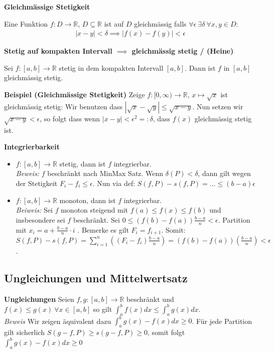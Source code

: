 \documentclass[25pt]{sciposter}
\newcommand{\R}{\mathbb{R}}
\newenvironment{method}[1]{\begin{mdframed}[backgroundcolor=blue!10,innertopmargin=15pt, innerbottommargin=15pt, nobreak=true]
		\textbf{#1 }
	}
	{ 
	\end{mdframed}
}
\begin{document}
\begin{multicols}{3}
\begin{method}{Gleichmässige Stetigkeit}
	Eine Funktion $f:D \to \R$, $D \subseteq \R$ ist auf $D$ gleichmässig falls $\forall \epsilon \ \exists \delta \ \forall x,y \in D$:
	\begin{align*}
			|x-y| < \delta \implies |f(x) - f(y)| < \epsilon
	\end{align*}
\end{method}

\begin{method}{Stetig auf kompakten Intervall $\implies$ gleichmässig stetig / (Heine)}
Sei $f : [a,b] \to \R$ stetig in dem kompakten Intervall $[a,b]$. Dann ist $f$ in $[a,b]$ gleichmässig stetig.
\end{method}

\textbf{Beispiel (Gleichmässige Stetigkeit)} Zeige $f:[0,\infty) \to \R$, $x \mapsto \sqrt{x}$ ist gleichmässig stetig: Wir benutzen dass $|\sqrt{x} - \sqrt{y}| \leq \sqrt{x - y}$. Nun setzen wir $ \sqrt{x - y} < \epsilon$, so folgt dass wenn $|x-y|< \epsilon^2 =: \delta$, dass $f(x)$ gleichmässig stetig ist.

\begin{method}{Integrierbarkeit}
	\begin{itemize}
		\item $f:[a,b]\to \R$ stetig, dann ist $f$ integrierbar. \\
		\textit{Beweis:} $f$ beschränkt nach MinMax Satz. Wenn $\delta(P) < \delta$, dann gilt wegen der Stetigkeit $F_i - f_i \leq \epsilon$. Nun via def: $S(f,P) - s(f,P) = \ldots \leq (b-a)\epsilon$
		\item $f:[a,b]\to \R$ monoton, dann ist $f$ integrierbar. \\
		\textit{Beiweis:} Sei $f$ monoton steigend mit $f(a) \leq f(x) \leq f(b)$ und insbesondere sei $f$ beschränkt. Sei $0 \leq (f(b) - f(a) )\frac{b-a}{n} < \epsilon$. Partition mit $x_i = a + \frac{b-a}{n}\cdot i $ . Bemerke es gilt $F_i = f_{i+1}$. Somit: $S(f,P) - s(f,P) =  \sum_{i=1}^{n}( (F_i - f_i)\frac{b-a}{n} ) = (f(b) - f(a)) (\frac{b-a}{n}) < \epsilon$.
	\end{itemize}
\end{method}



\subsection*{Ungleichungen und Mittelwertsatz}

\begin{method}{Ungleichungen} Seien $f,g :[a,b] \to \R$ beschränkt und $f(x) \leq g(x) \ \forall x \in [a,b]$ so gilt $\int_{a}^{b} f(x) dx \leq \int_{a}^{b} g(x) dx$.\\
	\textit{Beweis} Wir zeigen äquivalent dazu $\int_{a}^{b} g(x) - f(x) dx \geq 0$. Für jede Partition gilt sicherlich $S(g-f,P) \geq s(g-f,P) \geq 0$, somit folgt $\int_{a}^{b} g(x) - f(x) dx \geq 0$\\
	

\end{method}
\end{multicols}
\end{document}
